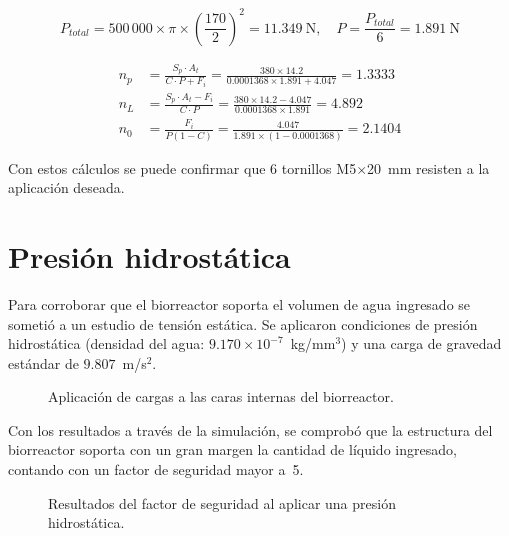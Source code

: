 \documentclass[11pt,tesis,twoside,openright,spanish]{upiiztt}
\begin{document}
\begin{equation}
P_{total} = 500\,000 \times \pi \times \left(\frac{170}{2}\right)^2 = 11.349\ \text{N}, \quad P = \frac{P_{total}}{6} = 1.891\ \text{N}
\end{equation}

\begin{align}
n_p &= \frac{S_p \cdot A_t}{C \cdot P + F_i} = \frac{380 \times 14.2}{0.0001368 \times 1.891 + 4.047} = 1.3333 \\
n_L &= \frac{S_p \cdot A_t - F_i}{C \cdot P} = \frac{380 \times 14.2 - 4.047}{0.0001368 \times 1.891} = 4.892 \\
n_0 &= \frac{F_i}{P(1 - C)} = \frac{4.047}{1.891 \times (1 - 0.0001368)} = 2.1404
\end{align}

Con estos cálculos se puede confirmar que 6 tornillos M5$\times$20~mm resisten a la
aplicación deseada.

\section*{Presión hidrostática}

Para corroborar que el biorreactor soporta el volumen de agua ingresado se
sometió a un estudio de tensión estática. Se aplicaron condiciones de presión
hidrostática (densidad del agua: $9.170 \times 10^{-7}$~kg/mm$^3$) y una carga de gravedad
estándar de $9.807$~m/s$^2$.

\begin{figure}[H]
  \centering
  \caption{Aplicación de cargas a las caras internas del biorreactor.}
  \label{fig:cargas_hidrostaticas}
\end{figure}

Con los resultados a través de la simulación, se comprobó que la estructura del
biorreactor soporta con un gran margen la cantidad de líquido ingresado, contando
con un factor de seguridad mayor a~5.

\begin{figure}[H]
  \centering
  \caption{Resultados del factor de seguridad al aplicar una presión hidrostática.}
  \label{fig:fs_hidrostatica}
\end{figure}
\end{document}

